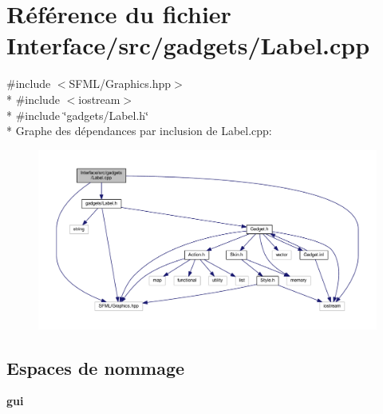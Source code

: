 \section{Référence du fichier Interface/src/gadgets/\+Label.cpp}
\label{_label_8cpp}
{\ttfamily \#include $<$S\+F\+M\+L/\+Graphics.\+hpp$>$}\\*
{\ttfamily \#include $<$iostream$>$}\\*
{\ttfamily \#include \char`\"{}gadgets/\+Label.\+h\char`\"{}}\\*
Graphe des dépendances par inclusion de Label.\+cpp\+:\nopagebreak
\begin{figure}[H]
\begin{center}
\leavevmode
\includegraphics[width=350pt]{_label_8cpp__incl}
\end{center}
\end{figure}
\subsection*{Espaces de nommage}
\begin{DoxyCompactItemize}
\item 
 {\bf gui}
\end{DoxyCompactItemize}
